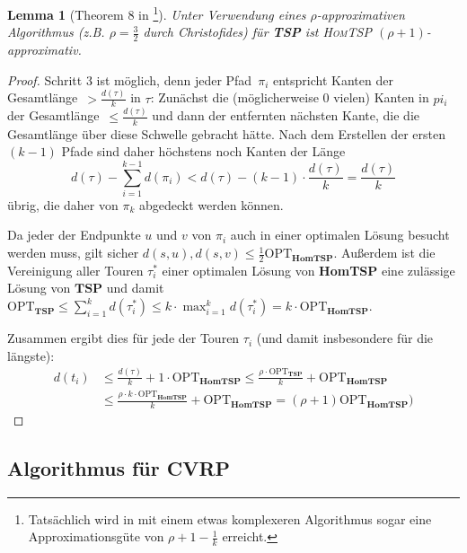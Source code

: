 \documentclass[a4paper,ngerman,12pt,bibtotoc]{scrartcl}
\theoremstyle{definition}
\theoremstyle{plain}
\newtheorem{lemma}[defn]{Lemma}
\theoremstyle{remark}
\newcommand{\OPT}{\mathrm{OPT}}
\newcommand{\TSP}{\textbf{TSP}}
\newcommand{\HomTSP}{\textbf{HomTSP}}
\newcommand{\CVRP}{\textbf{CVRP}}
\begin{document}
	\begin{lemma}[Theorem 8 in \cite{TourSpliting}\footnote{Tatsächlich wird in \cite{TourSpliting} mit einem etwas komplexeren Algorithmus sogar eine Approximationsgüte von $\rho + 1 - \frac{1}{k}$ erreicht.}]
		Unter Verwendung eines $\rho$-approximativen Algorithmus (z.B. $\rho=\frac{3}{2}$ durch Christofides) für \TSP{} ist \textsc{HomTSP} $(\rho+1)$-approximativ.
	\end{lemma}
	
	\begin{proof}
		Schritt 3 ist möglich, denn jeder Pfad~$\pi_i$ entspricht Kanten der Gesamtlänge~${>\frac{d(\tau)}{k}}$ in $\tau$: Zunächst die (möglicherweise 0 vielen) Kanten in $pi_i$ der Gesamtlänge~$\leq \frac{d(\tau)}{k}$ und dann der entfernten nächsten Kante, die die Gesamtlänge über diese Schwelle gebracht hätte. Nach dem Erstellen der ersten $(k-1)$ Pfade sind daher höchstens noch Kanten der Länge 
			\[d(\tau) - \sum_{i=1}^{k-1}d(\pi_i) < d(\tau) - (k-1)\cdot \frac{d(\tau)}{k} = \frac{d(\tau)}{k}\]
		übrig, die daher von $\pi_k$ abgedeckt werden können.
		
		Da jeder der Endpunkte $u$ und $v$ von $\pi_i$ auch in einer optimalen Lösung besucht werden muss, gilt sicher $d(s,u), d(s,v) \leq \frac{1}{2}\OPT_\HomTSP$. Außerdem ist die Vereinigung aller Touren $\tau_i^\ast$ einer optimalen Lösung von \HomTSP{} eine zulässige Lösung von $\TSP$ und damit $\OPT_\TSP \leq \sum_{i=1}^{k}d(\tau_i^\ast) \leq k\cdot \max_{i=1}^{k}d(\tau_i^\ast) = k\cdot \OPT_\HomTSP$.
		
		Zusammen ergibt dies für jede der Touren $\tau_i$ (und damit insbesondere für die längste):
		\begin{align*}
			d(t_i) &\leq \frac{d(\tau)}{k} + 1\cdot \OPT_\HomTSP \leq \frac{\rho\cdot \OPT_\TSP}{k} + \OPT_\HomTSP \\
			       &\leq \frac{\rho\cdot k\cdot \OPT_\HomTSP}{k} + \OPT_\HomTSP = (\rho+1) \OPT_\HomTSP)
		\end{align*}
	\end{proof}
	
	
	\newpage
	\subsection{Algorithmus für \CVRP}
	
\end{document}
